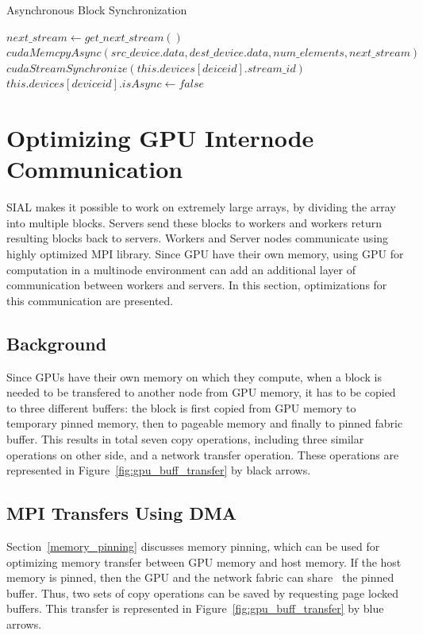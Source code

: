 \begin{algorithm} {Asynchronous Block Synchronization}
  \singlespacing

  \begin{algorithmic}[1]
    \State $next\_stream \gets get\_next\_stream()$
    \State $cudaMemcpyAsync(src\_device.data, dest\_device.data, num\_elements, next\_stream)$
    \EndFunction
    \\
    \State $cudaStreamSynchronize(this.devices[deiceid].stream\_id)$
    \State $this.devices[deviceid].isAsync \gets false$
    \EndIf
    \State {}
    \EndFunction
  \end{algorithmic}
\end{algorithm}

\section{Optimizing GPU Internode Communication}
SIAL makes it possible to work on extremely large arrays, by dividing the array into
multiple blocks. Servers send these blocks to workers and workers return
resulting blocks back to servers. Workers and
Server nodes communicate using highly optimized MPI library. Since GPU have their
own memory, using GPU for computation in a multinode environment can add an
additional layer of communication between workers and servers.
In this section, optimizations for this communication are presented.

\subsection{Background}
Since GPUs have their own memory on which they compute, when a block is needed
to be transfered to another node from GPU memory, it has to be copied to three different
buffers: the block is first copied from GPU memory to temporary pinned memory, then
to pageable memory and finally to pinned fabric buffer. This results in total
seven copy operations, including three similar operations on other side, and a network
transfer operation. These operations are represented in Figure~\ref{fig:gpu_buff_transfer}
by black arrows.

\subsection{MPI Transfers Using DMA}
Section~\ref{memory_pinning} discusses memory pinning, which can be used for
optimizing memory transfer between GPU memory and host memory. If the host memory
is pinned, then the GPU and the network fabric can share~\cite{cudaawarempi} the pinned buffer.
Thus, two sets of copy operations can be saved by requesting page locked
buffers. This transfer is represented in Figure~\ref{fig:gpu_buff_transfer} by blue
arrows.


